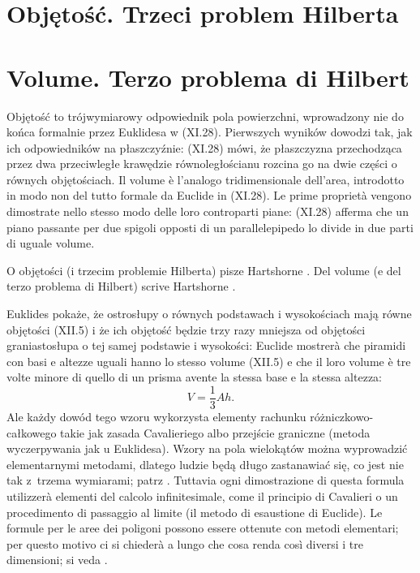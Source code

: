 %

\section{Objętość. Trzeci problem Hilberta} %
\section{Volume. Terzo problema di Hilbert} %
Objętość to trójwymiarowy odpowiednik pola powierzchni, wprowadzony nie do końca formalnie przez Euklidesa w (XI.28). %
Pierwszych wyników dowodzi tak, jak ich odpowiedników na płaszczyźnie: (XI.28) mówi, że płaszczyzna przechodząca przez dwa przeciwległe krawędzie równoległościanu rozcina go na dwie części o równych objętościach. %
Il volume è l'analogo tridimensionale dell'area, introdotto in modo non del tutto formale da Euclide in (XI.28). %
Le prime proprietà vengono dimostrate nello stesso modo delle loro controparti piane: (XI.28) afferma che un piano passante per due spigoli opposti di un parallelepipedo lo divide in due parti di uguale volume. %

O objętości (i trzecim problemie Hilberta) pisze Hartshorne \cite[s. 226--239]{hartshorne_2000}. %
Del volume (e del terzo problema di Hilbert) scrive Hartshorne \cite[p. 226--239]{hartshorne_2000}. %

Euklides pokaże, że ostrosłupy o równych podstawach i wysokościach mają równe objętości (XII.5) i że ich objętość będzie trzy razy mniejsza od objętości graniastosłupa o tej samej podstawie i wysokości: %
Euclide mostrerà che piramidi con basi e altezze uguali hanno lo stesso volume (XII.5) e che il loro volume è tre volte minore di quello di un prisma avente la stessa base e la stessa altezza: %
\begin{equation}
    V = \frac 1 3 A h.
\end{equation}
Ale każdy dowód tego wzoru wykorzysta elementy rachunku różniczkowo-całkowego takie jak zasada Cavalieriego albo przejście graniczne (metoda wyczerpywania jak u Euklidesa). %
Wzory na pola wielokątów można wyprowadzić elementarnymi metodami, dlatego ludzie będą długo zastanawiać się, co jest nie tak z~trzema wymiarami; patrz \cite[s. 195]{hartshorne_2000}. %
Tuttavia ogni dimostrazione di questa formula utilizzerà elementi del calcolo infinitesimale, come il principio di Cavalieri o un procedimento di passaggio al limite (il metodo di esaustione di Euclide). %
Le formule per le aree dei poligoni possono essere ottenute con metodi elementari; per questo motivo ci si chiederà a lungo che cosa renda così diversi i tre dimensioni; si veda \cite[p. 195]{hartshorne_2000}. %

